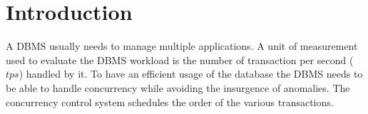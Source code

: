 \section{Introduction}

A DBMS usually needs to manage multiple applications. A unit of measurement used to evaluate the DBMS workload is the number of transaction per second ($tps$) handled by it. 
To have an efficient usage of the database the DBMS needs to be able to handle concurrency while avoiding the insurgence of anomalies. 
The concurrency control system schedules the order of the various transactions. 